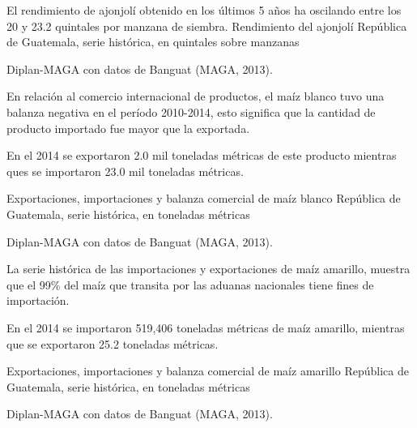 
%
{%
El rendimiento de ajonjolí obtenido en los últimos 5 años ha oscilando entre los 20 y 23.2 quintales por manzana de siembra.
}%
{%
	Rendimiento del ajonjolí} %
{%
	República de Guatemala, serie histórica, en quintales sobre manzanas } %
{%
	\begin{tikzpicture}[x=1pt,y=1pt]    \end{tikzpicture}}%
{%
	Diplan-MAGA con datos de Banguat (MAGA, 2013).} %



%
{%
En relación al comercio internacional de productos, el maíz blanco tuvo una balanza negativa en el período 2010-2014, esto significa que la cantidad de producto importado fue mayor que la exportada.

En el 2014 se exportaron 2.0 mil toneladas métricas de este producto mientras ques se importaron 23.0 mil toneladas métricas.}%
{%
	Exportaciones, importaciones y balanza comercial de maíz blanco} %
{%
	República de Guatemala, serie histórica, en toneladas métricas } %
{%
	\begin{tikzpicture}[x=1pt,y=1pt]    \end{tikzpicture}}%
{%
	Diplan-MAGA con datos de Banguat (MAGA, 2013).} %



%
{%
La serie histórica de las importaciones y exportaciones de maíz amarillo, muestra que el 99\% del maíz que transita por las aduanas nacionales tiene fines de importación.

En el 2014 se importaron 519,406 toneladas métricas de maíz amarillo, mientras que se exportaron 25.2 toneladas métricas. }%
{%
	Exportaciones, importaciones y balanza comercial de maíz amarillo} %
{%
	República de Guatemala, serie histórica, en toneladas métricas } %
{%
	\begin{tikzpicture}[x=1pt,y=1pt]    \end{tikzpicture}}%
{%
	Diplan-MAGA con datos de Banguat (MAGA, 2013).} %




